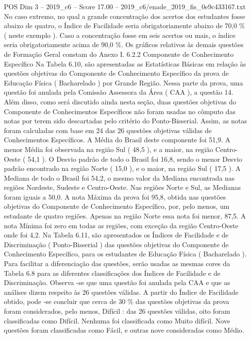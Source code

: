 \begin{textsample}{POS Dim 3 – 2019\_c6 – Score 17.00 – 2019\_c6/enade\_2019\_fis\_0e9c433167.txt}
No caso extremo, no qual a grande concentração dos acertos dos estudantes fosse abaixo de quatro, o Índice de Facilidade seria obrigatoriamente abaixo de 70,0 \% ( neste exemplo ).
Caso a concentração fosse em seis acertos ou mais, o índice seria obrigatoriamente acima de 90,0 \%.
Os gráficos relativos às demais questões de Formação Geral constam do Anexo I. 6.2.2 Componente de Conhecimento Específico Na Tabela 6.10, são apresentadas as Estatísticas Básicas em relação às questões objetivas do Componente de Conhecimento Específico da prova de Educação Física ( Bacharelado ) por Grande Região.
Nessa parte da prova, uma questão foi anulada pela Comissão Assessora da Área ( CAA ), a questão 14.
Além disso, como será discutido ainda nesta seção, duas questões objetivas do Componente de Conhecimentos Específicos não foram usadas no cômputo das notas por terem sido descartadas pelo critério do Ponto-Bisserial.
Assim, as notas foram calculadas com base em 24 das 26 questões objetivas válidas de Conhecimentos Específicos.
A Média do Brasil deste componente foi 51,9.
A menor Média foi observada na região Sul ( 48,5 ), e a maior, na região Centro-Oeste ( 54,1 ).
O Desvio padrão de todo o Brasil foi 16,8, sendo o menor Desvio padrão encontrado na região Norte ( 15,0 ), e o maior, na região Sul ( 17,5 ).
A Mediana de todo o Brasil foi 54,2, o mesmo valor da Mediana encontrada nas regiões Nordeste, Sudeste e Centro-Oeste.
Nas regiões Norte e Sul, as Medianas foram iguais a 50,0.
A nota Máxima da prova foi 95,8, obtida nas questões objetivas do Componente de Conhecimento Específico, por, pelo menos, um estudante de quatro regiões.
Apenas na região Norte essa nota foi menor, 87,5.
A nota Mínima foi zero em todas as regiões, com exceção da região Centro-Oeste onde foi 4,2.
Na Tabela 6.11, são apresentados os Índices de Facilidade e de Discriminação ( Ponto-Bisserial ) das questões objetivas do Componente de Conhecimento Específico, para os estudantes de Educação Física ( Bacharelado ).
Para facilitar a diferenciação das questões, serão usadas as mesmas cores da Tabela 6.8 para as diferentes classificações dos Índices de Facilidade e de Discriminação.
Observa -se que uma questão foi anulada pela CAA e que as análises dizem respeito às 26 questões válidas.
A partir do Índice de Facilidade obtido, pode -se concluir que cerca de 30 \% das questões objetivas da prova foram considerados, pelo menos, Difícil : das 26 questões válidas, oito foram classificadas como Difícil.
Nenhuma foi classificada como Muito difícil.
Nove questões foram classificadas como Fácil, e outras nove consideradas como Médio.

\end{textsample}
